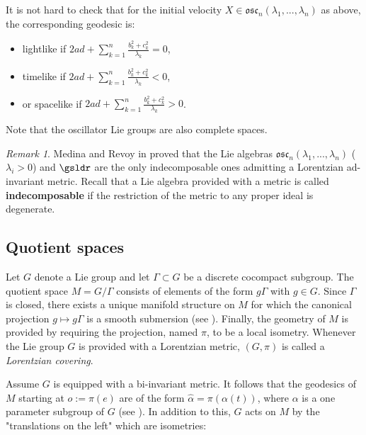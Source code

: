 \documentclass[11pt]{amsart}
\theoremstyle{plain}
\theoremstyle{definition}
\theoremstyle{remark}
\newtheorem{rem}{Remark}
\begin{document}
	It is not hard to check that for the initial velocity $X \in \mathfrak{osc}_n(\lambda_1,...,\lambda_n)$ as above, the corresponding geodesic is:
	\begin{itemize}
		\item lightlike if $2 a d + \sum_{k=1}^{n} \frac{b_k^2+c_k^2}{\lambda_k} = 0$,
		\item timelike if $2 a d + \sum_{k=1}^{n} \frac{b_k^2+c_k^2}{\lambda_k} < 0$, 
		\item or spacelike if $2 a d + \sum_{k=1}^{n} \frac{b_k^2+c_k^2}{\lambda_k} > 0$.
	\end{itemize}
	
	Note that the oscillator  Lie groups are also complete spaces. 
	
	\smallskip
	
	\begin{rem} Medina and Revoy  in \cite{Me,MeRe} proved that the Lie algebras $\mathfrak{osc}_n(\lambda_1,...,\lambda_n)$ ($\lambda_i > 0$) and $\gsldr$ are the only indecomposable ones admitting a Lorentzian ad-invariant metric. Recall that a Lie algebra provided with a metric is called \textbf{indecomposable} if the restriction of the metric to any proper ideal is degenerate. 
	\end{rem}
	
	
	\subsection{Quotient spaces} 
	
	
	
Let $G$ denote a Lie group and let  $\Gamma\subset G$ be a discrete cocompact subgroup. 	The quotient space $M=G/\Gamma$ consists of elements of the form $g\Gamma$ with $g \in G$. Since $\Gamma$ is closed, there exists a unique manifold structure on $M$ for which the canonical projection $g \mapsto g\Gamma$ is a smooth submersion (see \cite{Hel}). Finally, the geometry of $M$ is provided by requiring the projection, named $\pi$, to be a local isometry. Whenever the Lie group  $G$ is provided with a Lorentzian metric, $(G,\pi)$ is called  a \textit{Lorentzian covering}.
	
	
	
Assume $G$ is equipped with a bi-invariant metric. It follows  that the geodesics of $M$ starting at $o:=\pi(e)$ are of the form $\hat{\alpha}=\pi(\alpha(t))$, where $\alpha$ is a one parameter subgroup of $G$ (see \cite{ON}). In addition to this, $G$ acts on $M$ by the "translations on the left" which are isometries:
	
\end{document}
